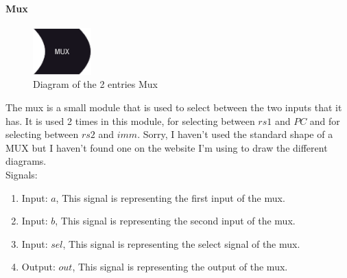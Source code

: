 \paragraph{Mux}

\begin{figure}[H]
    \centering
    \includegraphics[width=0.20\textwidth]{design/pipelined/decode/images/mux2.png}
    \caption{Diagram of the 2 entries Mux}
    \label{fig:mux2}
\end{figure}

The mux is a small module that is used to select between the two inputs that it has. It is used 2 times in this module, for selecting between
$rs1$ and $PC$ and for selecting between $rs2$ and $imm$. Sorry, I haven't used the standard shape of a MUX but I haven't found one on the 
website I'm using to draw the different diagrams. \\

Signals:
\begin{enumerate}[label={\textbullet}]
    \item Input: $a$, This signal is representing the first input of the mux.
    \item Input: $b$, This signal is representing the second input of the mux.
    \item Input: $sel$, This signal is representing the select signal of the mux.
    \item Output: $out$, This signal is representing the output of the mux.
\end{enumerate}